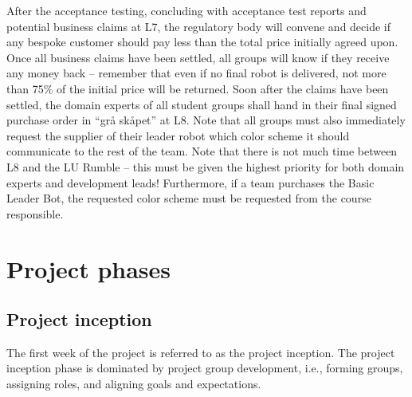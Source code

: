 \documentclass{scrreprt}
\begin{document}
After the acceptance testing, concluding with acceptance test reports and potential business claims at L7, the regulatory body will convene and decide if any bespoke customer should pay less than the total price initially agreed upon. Once all business claims have been settled, all groups will know if they receive any money back -- remember that even if no final robot is delivered, not more than 75\% of the initial price will be returned. Soon after the claims have been settled, the domain experts of all student groups shall hand in their final signed purchase order in ``grå skåpet'' at L8. Note that all groups must also immediately request the supplier of their leader robot which color scheme it should communicate to the rest of the team. Note that there is not much time between L8 and the LU Rumble -- this must be given the highest priority for both domain experts and development leads! Furthermore, if a team purchases the Basic Leader Bot, the requested color scheme must be requested from the course responsible. 

\chapter{Project phases}

\section{Project inception}
The first week of the project is referred to as the project inception. The project inception phase is dominated by project group development, i.e., forming groups, assigning roles, and aligning goals and expectations.
\end{document}
